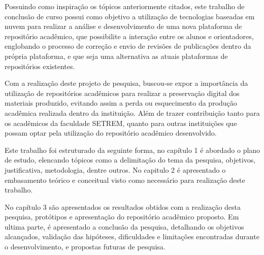 Possuindo como inspiração os tópicos anteriormente citados,
este trabalho de conclusão de curso possui como objetivo a utilização
de tecnologias baseadas em nuvem para realizar a análise e
desenvolvimento de uma nova plataforma de repositório acadêmico,
que possibilite a interação entre os alunos e orientadores,
englobando o processo de correção e envio de revisões
de publicações dentro da própria plataforma, e que seja uma alternativa
as atuais plataformas de repositórios existentes.

Com a realização deste projeto de pesquisa, buscou-se expor a
importância da utilização de repositórios acadêmicos para realizar
a preservação digital dos materiais produzido, evitando assim a perda
ou esquecimento da produção acadêmica realizada dentro da instituição.
Além de trazer contribuição tanto para os acadêmicos da faculdade SETREM, quanto para outras
instituições que possam optar pela utilização do repositório
acadêmico desenvolvido.

Este trabalho foi estruturado da seguinte forma, no capítulo 1
é abordado o plano de estudo, elencando tópicos como a delimitação
do tema da pesquisa, objetivos, justificativa, metodologia, dentre outros.
No capitulo 2 é apresentado o embasamento teórico e conceitual
visto como necessário para realização deste trabalho.

No capítulo 3 são apresentados os resultados obtidos com a realização desta
pesquisa, protótipos e apresentação do repositório acadêmico proposto.
Em ultima parte, é apresentado a conclusão da pesquisa,
detalhando os objetivos alcançados, validação das hipóteses, dificuldades
e limitações encontradas durante o desenvolvimento, e propostas futuras
de pesquisa.